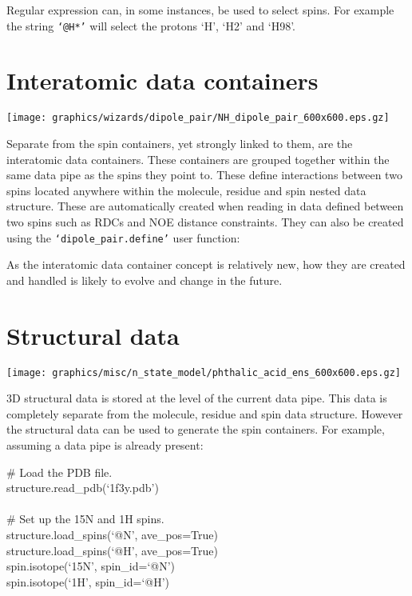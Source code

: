 Regular expression can, in some instances, be used to select spins.  For example the string \texttt{`@H*'} will select the protons `H', `H2' and `H98'.




\newpage
\section{Interatomic data containers}

\begin{figure*}[h]
\texttt{[image: graphics/wizards/dipole\_pair/NH\_dipole\_pair\_600x600.eps.gz]}
\end{figure*}

Separate from the spin containers, yet strongly linked to them, are the interatomic data containers.  These containers are grouped together within the same data pipe as the spins they point to.  These define interactions between two spins located anywhere within the molecule, residue and spin nested data structure.  These are automatically created when reading in data defined between two spins such as RDCs and NOE distance constraints.  They can also be created using the \texttt{`dipole\_pair.define'} user function:


As the interatomic data container concept is relatively new, how they are created and handled is likely to evolve and change in the future.



\section{Structural data}

\begin{figure*}[h]
\texttt{[image: graphics/misc/n\_state\_model/phthalic\_acid\_ens\_600x600.eps.gz]}
\end{figure*}

3D structural data is stored at the level of the current data pipe.  This data is completely separate from the molecule, residue and spin data structure.  However the structural data can be used to generate the spin containers.  For example, assuming a data pipe is already present:

\begin{exampleenv}
\# Load the PDB file. \\
structure.read\_pdb(`1f3y.pdb') \\
 \\
\# Set up the 15N and 1H spins. \\
structure.load\_spins(`@N', ave\_pos=True) \\
structure.load\_spins(`@H', ave\_pos=True) \\
spin.isotope(`15N', spin\_id=`@N') \\
spin.isotope(`1H', spin\_id=`@H')
\end{exampleenv}

